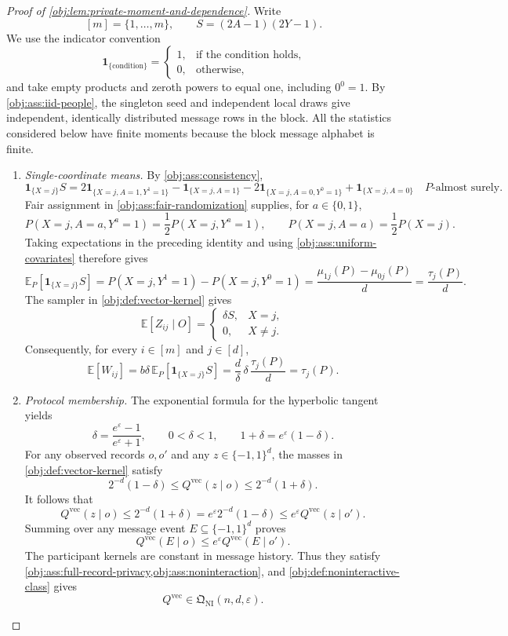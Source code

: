\documentclass[11pt]{article}
\begin{document}
\begin{proof}[Proof of \cref{obj:lem:private-moment-and-dependence}]
Write
\[
[m]=\{1,\ldots,m\},
\qquad
S=(2A-1)(2Y-1).
\]
We use the indicator convention
\[
\mathbf1_{\{\text{condition}\}}
=
\begin{cases}
1,&\text{if the condition holds},\\
0,&\text{otherwise},
\end{cases}
\]
and take empty products and zeroth powers to equal one, including \(0^0=1\).
By \cref{obj:ass:iid-people}, the singleton seed and independent local draws give independent, identically distributed message rows in the block. All the statistics considered below have finite moments because the block message alphabet is finite.

\begin{enumerate}
\item \textit{Single-coordinate means.}
By \cref{obj:ass:consistency},
\[
\mathbf1_{\{X=j\}}S
=
2\mathbf1_{\{X=j,A=1,Y^1=1\}}
-\mathbf1_{\{X=j,A=1\}}
-2\mathbf1_{\{X=j,A=0,Y^0=1\}}
+\mathbf1_{\{X=j,A=0\}}
\quad P\text{-almost surely}.
\]
Fair assignment in \cref{obj:ass:fair-randomization} supplies, for \(a\in\{0,1\}\),
\[
P(X=j,A=a,Y^a=1)=\frac12P(X=j,Y^a=1),
\qquad
P(X=j,A=a)=\frac12P(X=j).
\]
Taking expectations in the preceding identity and using
\cref{obj:ass:uniform-covariates} therefore gives
\[
\mathbb E_P[\mathbf1_{\{X=j\}}S]
=
P(X=j,Y^1=1)-P(X=j,Y^0=1)
=
\frac{\mu_{1j}(P)-\mu_{0j}(P)}d
=
\frac{\tau_j(P)}d.
\]
The sampler in \cref{obj:def:vector-kernel} gives
\[
\mathbb E[Z_{ij}\mid O]
=
\begin{cases}
\delta S,&X=j,\\
0,&X\ne j.
\end{cases}
\]
Consequently, for every \(i\in[m]\) and \(j\in[d]\),
\[
\mathbb E[W_{ij}]
=
b\delta\,\mathbb E_P[\mathbf1_{\{X=j\}}S]
=
\frac d\delta\,\delta\,\frac{\tau_j(P)}d
=
\tau_j(P).
\]

\item \textit{Protocol membership.}
The exponential formula for the hyperbolic tangent yields
\[
\delta=\frac{e^\varepsilon-1}{e^\varepsilon+1},
\qquad
0<\delta<1,
\qquad
1+\delta=e^\varepsilon(1-\delta).
\]
For any observed records \(o,o'\) and any
\(z\in\{-1,1\}^d\), the masses in
\cref{obj:def:vector-kernel} satisfy
\[
2^{-d}(1-\delta)
\le Q^{\mathrm{vec}}(z\mid o)
\le 2^{-d}(1+\delta).
\]
It follows that
\[
Q^{\mathrm{vec}}(z\mid o)
\le
2^{-d}(1+\delta)
=
e^\varepsilon2^{-d}(1-\delta)
\le
e^\varepsilon Q^{\mathrm{vec}}(z\mid o').
\]
Summing over any message event \(E\subseteq\{-1,1\}^d\) proves
\[
Q^{\mathrm{vec}}(E\mid o)
\le e^\varepsilon Q^{\mathrm{vec}}(E\mid o').
\]
The participant kernels are constant in message history. Thus they satisfy
\cref{obj:ass:full-record-privacy,obj:ass:noninteraction}, and
\cref{obj:def:noninteractive-class} gives
\[
Q^{\mathrm{vec}}\in\mathfrak Q_{\mathrm{NI}}(n,d,\varepsilon).
\]


\end{enumerate}
\end{proof}
\end{document}
